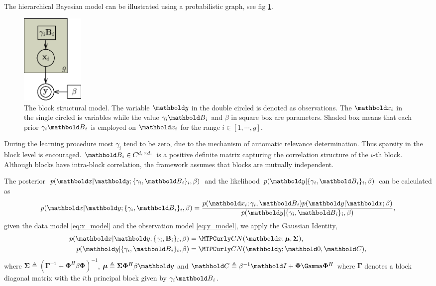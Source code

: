 The hierarchical Bayesian model can be illustrated using a probabilistic graph, 
see fig \ref{fig:bm}.
\begin{figure}[!htbp]
\centering
\includegraphics[width=1.2in]{blockmodel}
\caption{The block structural model. The variable $\ve{y}$ in the double 
circled is denoted as observations. The $\ve{x}_i$ in the single circled 
is variables while the value $\gamma_i\ve{B}_i$ and $\beta$ in square box 
are parameters. Shaded box means that each prior $\gamma_i\ve{B}_i$ 
is employed on $\ve{x}_i$ for the range $i\in[1,\cdots,g]$.%
}\label{fig:bm}
\end{figure}
During the learning procedure most $\gamma_i$ tend to be zero, due to the mechanism of automatic relevance determination\cite{Tipping2001}. Thus sparsity in the block level is encouraged\cite{Zhang2011}. $\ve{B}_i\in\mathbb{C}^{d_i\times d_i}$ is a positive definite matrix capturing the correlation structure of the $i$-th block. Although blocks have intra-block correlation, the framework assumes that blocks are mutually independent. 

The posterior $p(\ve{x}|\ve{y}; \{\gamma_i,\ve{B}_i\}_i,\beta)$ and 
the likelihood $p(\ve{y}|\{\gamma_i,\ve{B}_i\}_i,\beta)$ can be calculated as
\begin{equation}
p(\ve{x}|\ve{y}; \{\gamma_i,\ve{B}_i\}_i,\beta) = 
\frac{p(\ve{x}_i;{\gamma_i},\ve{B}_i)p(\ve{y}|\ve{x};\beta)}{p(\ve{y}|\{\gamma_i,\ve{B}_i\}_i,\beta)},
\end{equation}
given the data model \eqref{eq:x_model} and the observation model \eqref{eq:y_model},
we apply the Gaussian Identity\cite{Petersen2008},
\begin{align}
p(\ve{x}|\ve{y}; \{\gamma_i,\mathbf{B}_i\}_i,\beta) &=
\mathcal{CN}(\ve{x};\bm{\mu},\bm{\Sigma}), \\
p(\ve{y}|\{\gamma_i,\ve{B}_i\}_i,\beta) &= 
\mathcal{CN}(\ve{y};\ve{0},\ve{C}),
\end{align}
where
$\bm{\Sigma} \triangleq (\bm{\Gamma}^{-1} + \bm{\Phi}^H\beta\bm{\Phi})^{-1}$,
$\bm{\mu} \triangleq \bm{\Sigma}\bm{\Phi}^H\beta\ve{y}$ and
$\ve{C} \triangleq \beta^{-1}\ve{I} + \bm{\Phi}\bm{\Gamma}\bm{\Phi}^H$ where
$\bm{\Gamma}$ denotes a block diagonal matrix with the $i$th principal block
given by $\gamma_i\ve{B}_i$.

